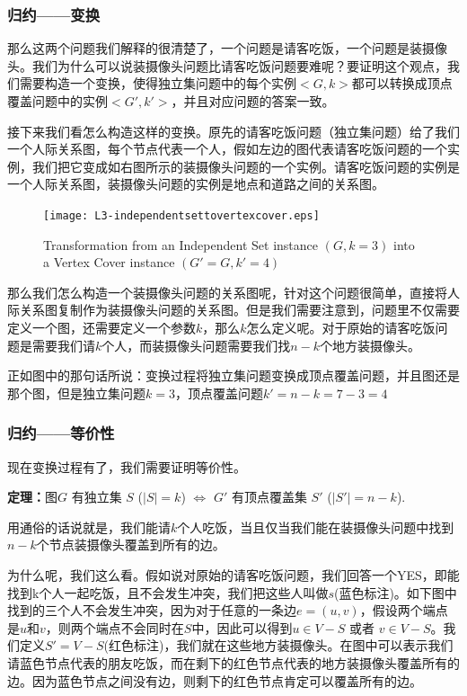 \subsubsection{归约——变换}

那么这两个问题我们解释的很清楚了，一个问题是请客吃饭，一个问题是装摄像头。我们为什么可以说装摄像头问题比请客吃饭问题要难呢？要证明这个观点，我们需要构造一个变换，使得独立集问题中的每个实例$<G, k>$都可以转换成顶点覆盖问题中的实例$<G', k'>$，并且对应问题的答案一致。

接下来我们看怎么构造这样的变换。原先的请客吃饭问题（独立集问题）给了我们一个人际关系图，每个节点代表一个人，假如左边的图代表请客吃饭问题的一个实例，我们把它变成如右图所示的装摄像头问题的一个实例。请客吃饭问题的实例是一个人际关系图，装摄像头问题的实例是地点和道路之间的关系图。

\begin{figure}[H]
	\centering
 	\texttt{[image: L3-independentsettovertexcover.eps]}
\caption{Transformation from an {\sc Independent Set} instance $(G, k=3)$ into a {\sc Vertex Cover} instance $(G'=G, k'=4)$}
\end{figure}

那么我们怎么构造一个装摄像头问题的关系图呢，针对这个问题很简单，直接将人际关系图复制作为装摄像头问题的关系图。但是我们需要注意到，问题里不仅需要定义一个图，还需要定义一个参数$k$，那么$k$怎么定义呢。对于原始的请客吃饭问题是需要我们请$k$个人，而装摄像头问题需要我们找$n-k$个地方装摄像头。

正如图中的那句话所说：变换过程将独立集问题变换成顶点覆盖问题，并且图还是那个图，但是独立集问题$k=3$，顶点覆盖问题$k'=n-k=7-3=4$

\subsubsection{归约——等价性}

现在变换过程有了，我们需要证明等价性。

\textbf{定理：}图$G$ 有独立集 $S$ ($|S|=k$) $\Leftrightarrow$ $G'$ 有顶点覆盖集 $S'$ ($|S'|=n-k$). 

用通俗的话说就是，我们能请$k$个人吃饭，当且仅当我们能在装摄像头问题中找到$n-k$个节点装摄像头覆盖到所有的边。

为什么呢，我们这么看。假如说对原始的请客吃饭问题，我们回答一个YES，即能找到k个人一起吃饭，且不会发生冲突，我们把这些人叫做$s$(蓝色标注)。如下图中找到的三个人不会发生冲突，因为对于任意的一条边$e=(u,v)$，假设两个端点是$u$和$v$，则两个端点不会同时在$S$中，因此可以得到$u \in V-S$ 或者 $v \in V-S$。我们定义$S'=V-S$(红色标注)，我们就在这些地方装摄像头。在图中可以表示我们请蓝色节点代表的朋友吃饭，而在剩下的红色节点代表的地方装摄像头覆盖所有的边。因为蓝色节点之间没有边，则剩下的红色节点肯定可以覆盖所有的边。

